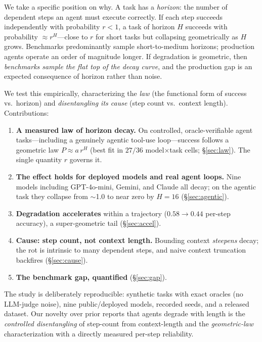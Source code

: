 \documentclass[11pt]{article}
\newcommand{\rstep}{r}
\newcommand{\horizon}{H}
\begin{document}
We take a specific position on why. A task has a \emph{horizon}: the number of
dependent steps an agent must execute correctly. If each step succeeds independently
with probability $\rstep<1$, a task of horizon $\horizon$ succeeds with probability
$\approx \rstep^{\horizon}$---close to $\rstep$ for short tasks but collapsing
geometrically as $\horizon$ grows. Benchmarks predominantly sample short-to-medium
horizons; production agents operate an order of magnitude longer. If degradation is
geometric, then \emph{benchmarks sample the flat top of the decay curve}, and the
production gap is an expected consequence of horizon rather than noise.

We test this empirically, characterizing the \emph{law} (the functional form of
success vs.\ horizon) and \emph{disentangling its cause} (step count vs.\ context
length). Contributions:
\begin{enumerate}
\item \textbf{A measured law of horizon decay.} On controlled, oracle-verifiable agent
  tasks---including a genuinely agentic tool-use loop---success follows a geometric law
  $P\approx a\,\rstep^{\horizon}$ (best fit in $27/36$ model$\times$task cells;
  \S\ref{sec:law}). The single quantity $\rstep$ governs it.
\item \textbf{The effect holds for deployed models and real agent loops.} Nine models
  including GPT-4o-mini, Gemini, and Claude all decay; on the agentic task they collapse
  from $\sim$1.0 to near zero by $H{=}16$ (\S\ref{sec:agentic}).
\item \textbf{Degradation accelerates} within a trajectory ($0.58\to0.44$ per-step
  accuracy), a super-geometric tail (\S\ref{sec:accel}).
\item \textbf{Cause: step count, not context length.} Bounding context \emph{steepens}
  decay; the rot is intrinsic to many dependent steps, and naive context truncation
  backfires (\S\ref{sec:cause}).
\item \textbf{The benchmark gap, quantified} (\S\ref{sec:gap}).
\end{enumerate}
The study is deliberately reproducible: synthetic tasks with exact oracles (no
LLM-judge noise), nine public/deployed models, recorded seeds, and a released dataset.
Our novelty over prior reports that agents degrade with length \citep{kwa2025metr,
laban2025lostconv} is the \emph{controlled disentangling} of step-count from
context-length and the \emph{geometric-law} characterization with a directly measured
per-step reliability.
\end{document}
